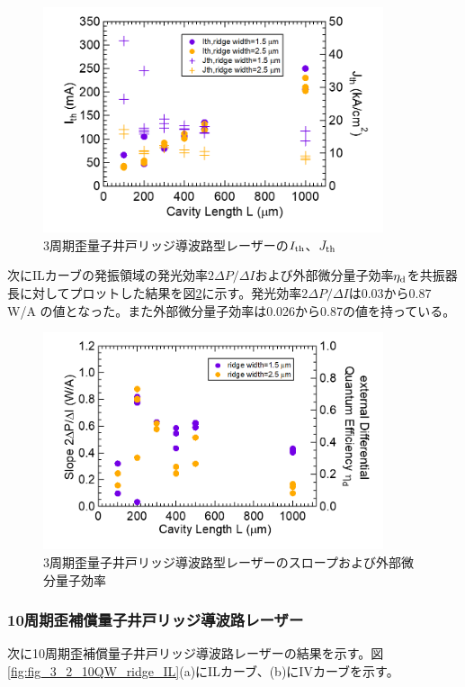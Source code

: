 {\begin{figure}[h]
	\centering
	\includegraphics[width=10cm]{figure/fig_3_2_3QW_ridge_Ith.png}
		\caption{3周期歪量子井戸リッジ導波路型レーザーの$I_{\rm{th}}$、$J_{\rm{th}}$}
		\label{fig:fig_3_2_3QW_ridge_Ith}
\end{figure}
次にILカーブの発振領域の発光効率$2 \Delta P/\Delta I$および外部微分量子効率$\eta_{\rm{d}}$を共振器長に対してプロットした結果を図\ref{fig:fig_3_2_3QW_ridge_slope}に示す。発光効率$2 \Delta P/\Delta I$は0.03から0.87 W/A の値となった。また外部微分量子効率は0.026から0.87の値を持っている。
\begin{figure}[h]
	\centering
	\includegraphics[width=10cm]{figure/fig_3_2_3QW_ridge_slope.png}
		\caption{3周期歪量子井戸リッジ導波路型レーザーのスロープおよび外部微分量子効率}
		\label{fig:fig_3_2_3QW_ridge_slope}
\end{figure}

\clearpage
\subsubsection{10周期歪補償量子井戸リッジ導波路レーザー}
次に10周期歪補償量子井戸リッジ導波路レーザーの結果を示す。図\ref{fig:fig_3_2_10QW_ridge_IL}(a)にILカーブ、(b)にIVカーブを示す。

}
